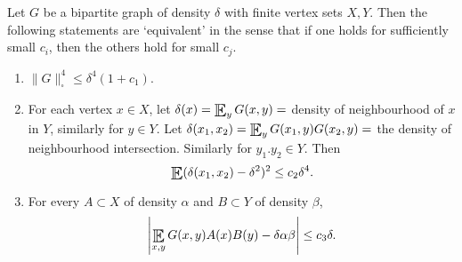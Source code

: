 \documentclass{article}
\DeclareMathOperator*{\E}{\scalerel*{\mathbb{E}}{\textstyle\sum}}
\newcommand{\1}[1]{\mathbbm{1}_{#1}}
\begin{document}
\begin{nlemma}\label{lem:3.6}
  Let $G$ be a bipartite graph of density $\delta$ with finite vertex sets $X,Y$.
  Then the following statements are `equivalent' in the sense that if one holds for sufficiently small $c_i$, then the others hold for small $c_j$.
  \begin{enumerate}[label=(\roman*)]
    \item $\|G\|_\square^4 \leq \delta^4 (1+c_1)$.
    \item For each vertex $x \in X$, let $\delta(x) = \E_y G(x,y) =$ density of neighbourhood of $x$ in $Y$, similarly for $y \in Y$.
      Let $\delta(x_1,x_2) = \E_y G(x_1,y) G(x_2,y) =$ the density of neighbourhood intersection.
      Similarly for $y_1. y_2 \in Y$. Then
      \begin{equation*}
        \E(\delta(x_1, x_2) - \delta^2)^2 \leq c_2 \delta^4.
      \end{equation*}
    \item For every $A \subset X$ of density $\alpha$ and $B \subset Y$ of density $\beta$,
      \begin{equation*}
        \left|\E_{x,y} G(x,y) A(x) B(y) - \delta \alpha \beta\right| \leq c_3 \delta.
      \end{equation*}
  \end{enumerate}
\end{nlemma}
\end{document}
